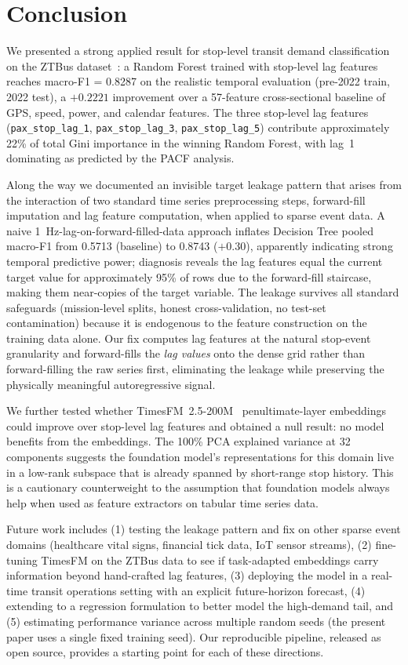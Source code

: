 \section{Conclusion}
\label{sec:conclusion}

We presented a strong applied result for stop-level transit demand
classification on the ZTBus dataset~\cite{widmer2023ztbus}: a Random
Forest trained with stop-level lag features reaches macro-F1 = 0.8287
on the realistic temporal evaluation (pre-2022 train, 2022 test), a
$+0.2221$ improvement over a 57-feature cross-sectional baseline of
GPS, speed, power, and calendar features. The three stop-level lag
features (\texttt{pax\_stop\_lag\_1}, \texttt{pax\_stop\_lag\_3},
\texttt{pax\_stop\_lag\_5}) contribute approximately 22\% of total
Gini importance in the winning Random Forest, with lag~1 dominating
as predicted by the PACF analysis.

Along the way we documented an invisible target leakage pattern that
arises from the interaction of two standard time series preprocessing
steps, forward-fill imputation and lag feature computation, when applied
to sparse event data. A naive 1~Hz-lag-on-forward-filled-data approach
inflates Decision Tree pooled macro-F1 from 0.5713 (baseline) to
0.8743 ($+0.30$), apparently indicating strong temporal predictive
power;
diagnosis reveals the lag features equal the current target value for
approximately 95\% of rows due to the forward-fill staircase, making
them near-copies of the target variable. The leakage survives all
standard safeguards (mission-level splits, honest cross-validation, no
test-set contamination) because it is endogenous to the feature
construction on the training data alone. Our fix computes lag features
at the natural stop-event granularity and forward-fills the \emph{lag
values} onto the dense grid rather than forward-filling the raw series
first, eliminating the leakage while preserving the physically
meaningful autoregressive signal.

We further tested whether TimesFM~2.5-200M~\cite{das2024timesfm}
penultimate-layer embeddings could improve over stop-level lag features
and obtained a null result: no model benefits from the embeddings. The
100\% PCA explained variance at 32 components suggests the foundation
model's representations for this domain live in a low-rank subspace that
is already spanned by short-range stop history. This is a cautionary
counterweight to the assumption that foundation models always help when
used as feature extractors on tabular time series data.

Future work includes (1) testing the leakage pattern and fix on other
sparse event domains (healthcare vital signs, financial tick data, IoT
sensor streams), (2) fine-tuning TimesFM on the ZTBus data to see if
task-adapted embeddings carry information beyond hand-crafted lag
features, (3) deploying the model in a real-time transit operations
setting with an explicit future-horizon forecast, (4) extending to a
regression formulation to better model the high-demand tail, and (5)
estimating performance variance across multiple random seeds (the
present paper uses a single fixed training seed). Our reproducible
pipeline, released as open source, provides a starting point for each
of these directions.
